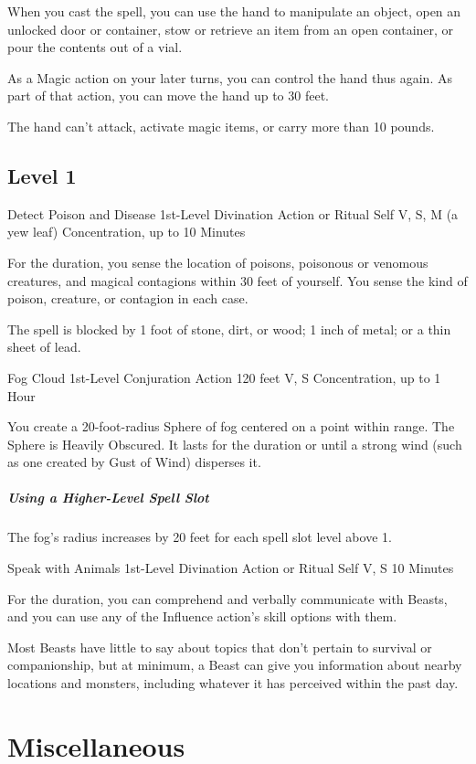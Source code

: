 \documentclass[letterpaper,openany,oneside,twocolumn]{book}
\begin{document}
When you cast the spell, you can use the hand to manipulate an object, open an unlocked door or container, stow or retrieve an item from an open container, or pour the contents out of a vial.

As a Magic action on your later turns, you can control the hand thus again. As part of that action, you can move the hand up to 30 feet.

The hand can't attack, activate magic items, or carry more than 10 pounds.

\subsection*{Level 1}

\DndSpellHeader
  {Detect Poison and Disease}
  {1st-Level Divination}
  {Action or Ritual}
  {Self}
  {V, S, M (a yew leaf)}
  {Concentration, up to 10 Minutes}

For the duration, you sense the location of poisons, poisonous or venomous creatures, and magical contagions within 30 feet of yourself. You sense the kind of poison, creature, or contagion in each case.

The spell is blocked by 1 foot of stone, dirt, or wood; 1 inch of metal; or a thin sheet of lead.

\DndSpellHeader
  {Fog Cloud}
  {1st-Level Conjuration}
  {Action}
  {120 feet}
  {V, S}
  {Concentration, up to 1 Hour}

You create a 20-foot-radius Sphere of fog centered on a point within range. The Sphere is Heavily Obscured. It lasts for the duration or until a strong wind (such as one created by Gust of Wind) disperses it.

\subparagraph*{Using a Higher-Level Spell Slot} The fog's radius increases by 20 feet for each spell slot level above 1.

\DndSpellHeader
  {Speak with Animals}
  {1st-Level Divination}
  {Action or Ritual}
  {Self}
  {V, S}
  {10 Minutes}

For the duration, you can comprehend and verbally communicate with Beasts, and you can use any of the Influence action's skill options with them.

Most Beasts have little to say about topics that don't pertain to survival or companionship, but at minimum, a Beast can give you information about nearby locations and monsters, including whatever it has perceived within the past day.
\vfill\eject
\section*{Miscellaneous}
\end{document}
